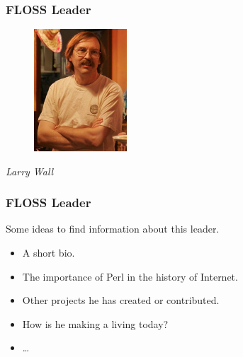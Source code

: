 \documentclass{beamer}
\begin{document}
\begin{frame}
\frametitle{FLOSS Leader}

\begin{figure}[h]
\begin{center}
  \includegraphics[height=1.80in]{figs/larry_wall.jpg}
\end{center}
\end{figure}

\pause

\begin{center}
{\it Larry Wall}
\end{center}

\end{frame}

\begin{frame}
\frametitle{FLOSS Leader}

Some ideas to find information about this leader.
\pause
\begin{itemize}
\item A short bio.
\item The importance of Perl in the history of Internet.
\item Other projects he has created or contributed.
\item How is he making a living today?
\item \ldots
\end{itemize}

\end{frame}
\end{document}
